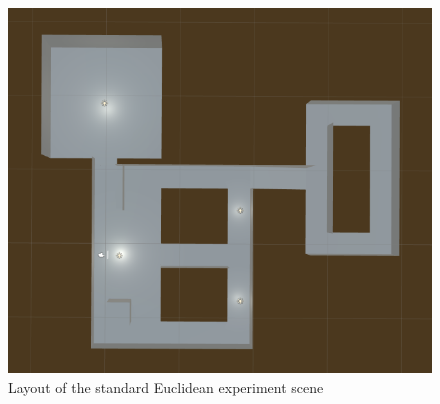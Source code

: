 			\begin{figure}[H]
				\includegraphics[width=1\textwidth]{Images/Standard_Layout}
				\centering
				\caption{Layout of the standard Euclidean experiment scene}
				\label{design:fig:design:standard}
			\end{figure}
